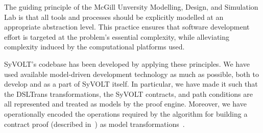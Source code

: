 

The guiding principle of the McGill Unversity Modelling, Design, and Simulation
Lab is that all tools and processes should be explicitly modelled at an
appropriate abstraction level. This practice ensures that software development
effort is targeted at the problem's essential complexity, while alleviating complexity induced by the computational platforms used.


SyVOLT's codebase has been developed by applying these principles. We have used
available model-driven development technology as much as possible, both to
develop and as a part of SyVOLT itself. In particular, we have made it such that
the DSLTrans transformations, the SyVOLT contracts, and path conditions are all represented and treated as models by the proof engine.
 Moreover, we have operationally encoded the
 operations required by the algorithm for building a contract proof (described
 in~\cite{Lucio2014}) as model transformations~\cite{LucioVang}.

